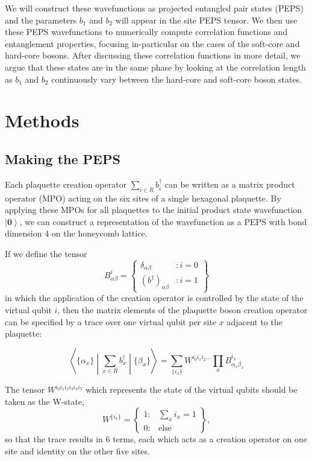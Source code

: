 \documentclass{article}
\newcommand{\ket}[1]{\left |#1 \right \rangle}
\newcommand{\braopket}[3]{\left \langle #1 \middle |#2 \middle | #3 \right \rangle}
\begin{document}
We will construct these wavefunctions as projected entangled pair states (PEPS) and the parameters $b_1$ and $b_2$ will appear in the site PEPS tensor. We then use these PEPS wavefunctions to numerically compute  correlation functions and entanglement properties, focusing in-particular on the cases of the soft-core and hard-core bosons. After discussing these correlation functions in more detail, we argue that these states are in the same phase by looking at the correlation length as $b_1$ and $b_2$ continuously vary between the hard-core and soft-core boson states.

\section{Methods}

\subsection{Making the PEPS}
Each plaquette creation operator $\sum\limits_{i \in R} b^{\dagger}_{i}$ can be written as a matrix product operator (MPO) acting on the six sites of a single hexagonal plaquette. By applying these MPOs for all plaquettes to the initial product state wavefunction $\ket{\mathbf{0}}$, we can construct a representation of the wavefunction as a PEPS with bond dimension 4 on the honeycomb lattice. 

If we define the tensor
$$
B^i_{\alpha \beta} = \left\{
     \begin{array}{lr}
       \delta_{\alpha \beta} & : i = 0\\
       (b^{\dagger})_{\alpha \beta} & : i = 1
     \end{array}
   \right\}
$$
in which the application of the creation operator is controlled by the state of the virtual qubit $i$,
then the matrix elements of the plaquette boson creation operator can be specified by a trace over one virtual qubit per site $x$ adjacent to the plaquette:

\begin{equation}
\braopket{\{\alpha_x\}}{\sum\limits_{x \in R} b^{\dagger}_{x}}{\{\beta_x\}} =
 \sum\limits_{\{i_x\}} W^{i_0 i_1 i_2 ...} \prod\limits_x B^{i_x}_{\alpha_x \beta_x} 
\label{eq:plaquette}
\end{equation}

The tensor $W^{i_0 i_1 i_2 i_3 i_4 i_5}$ which represents the state of the virtual qubits should be taken as the W-state, 
$$ W^{\{i_x\}}  = \left\{ \begin{array}{lr}
													1  : & \sum\limits_x i_x = 1 \\
													0  : & \text{else}
													\end{array}
											\right\},
$$
so that the trace results in 6 terms, each which acts as a creation operator on one site and identity on the other five sites.
\end{document}

